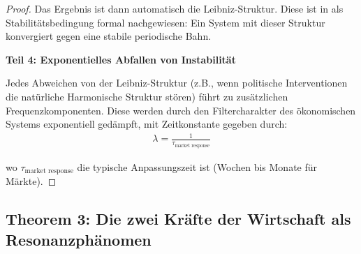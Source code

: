 \documentclass[a4paper, 12pt, twoside, openright]{report}
\theoremstyle{definition}
\theoremstyle{definition}
\begin{document}
\begin{proof}
Das Ergebnis ist dann automatisch die Leibniz-Struktur. Diese ist in \cite{epp_signal} als Stabilitätsbedingung formal nachgewiesen: Ein System mit dieser Struktur konvergiert gegen eine stabile periodische Bahn.

\textbf{Teil 4: Exponentielles Abfallen von Instabilität}

Jedes Abweichen von der Leibniz-Struktur (z.B., wenn politische Interventionen die natürliche Harmonische Struktur stören) führt zu zusätzlichen Frequenzkomponenten. Diese werden durch den Filtercharakter des ökonomischen Systems exponentiell gedämpft, mit Zeitkonstante gegeben durch:
\begin{align}
\lambda = \frac{1}{\tau_{\text{market response}}}
\end{align}

wo $\tau_{\text{market response}}$ die typische Anpassungszeit ist (Wochen bis Monate für Märkte).

\end{proof}

\subsection*{Theorem 3: Die zwei Kräfte der Wirtschaft als Resonanzphänomen}
\end{document}
